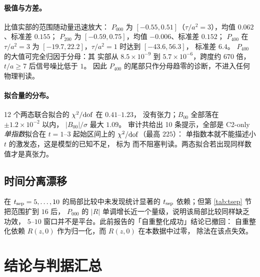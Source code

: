 \documentclass[UTF8,a4paper,11pt]{ctexart}
\newcommand{\code}[1]{\texttt{\detokenize{#1}}}
\begin{document}
\paragraph{极值与方差。}
比值实部的范围随动量迅速放大：
$P_{000}$ 为 $[-0.55,0.51]$（$\tau/a^2=3$），均值 $0.062$、标准差 $0.155$；
$P_{200}$ 为 $[-0.59,0.75]$，均值 $-0.006$、标准差 $0.152$；
$P_{400}$ 在 $\tau/a^2=3$ 为 $[-19.7,22.2]$，$\tau/a^2=1$ 时达到 $[-43.6,56.3]$，
标准差 $6.4$。
$P_{400}$ 的大值可完全归因于分母：其 \code{c2\_mean} 实部从 $8.5\times10^{-9}$
到 $5.7\times10^{-6}$，跨度约 $670$ 倍，$t/a\ge7$ 后信号噪比低于 $1$。
因此 $P_{400}$ 的尾部只作分母趋零的诊断，不进入任何物理判读。

\paragraph{拟合量的分布。}
12 个两态联合拟合的 $\chi^2/{\rm dof}$ 在 $0.41$--$1.23$，
没有张力；$B_{00}$ 全部落在 $\pm1.2\times10^{-2}$ 以内，
$|B_{00}|/\sigma$ 最大 $1.09$。
审计共给出 10 条提示，全部是 C2-only \emph{单指数}拟合在
$t=1$--$3$ 起始区间上的 $\chi^2/{\rm dof}$（最高 $225$）：
单指数本就不能描述小 $t$ 的激发态，这是模型的已知不足，
标为 \code{info} 而不阻塞判读。两态拟合若出现同样数值才是真张力。

\subsection{时间分离漂移}

在 $t_{\rm sep}=5,\dots,10$ 的局部比较中未发现统计显著的
$t_{\rm sep}$ 依赖；但第 \ref{tab:tsep} 节把范围扩到 $16$ 后，
$P_{000}$ 的 $|R|$ 单调增长近一个量级，说明该局部比较同样缺乏功效，
$5$--$10$ 窗口并不是平台。此前报告的「自重整化成功」结论已撤回：
自重整化依赖 $R(z,0)$ 作为归一化，而 $R(z,0)$ 在本数据中过零，
除法在该点失效。

\section{结论与判据汇总}
\end{document}

